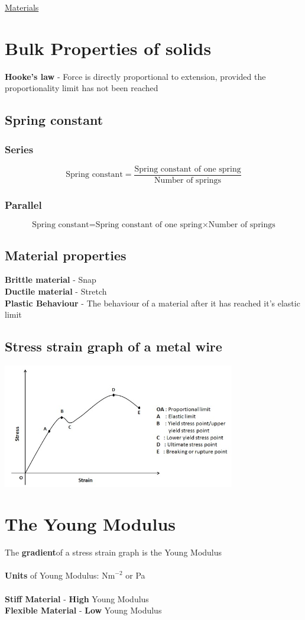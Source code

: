 \documentclass{article}[18pt]
\begin{document}
\begin{center}
\underline{\huge Materials}
\end{center}
\section{Bulk Properties of solids}
\textbf{Hooke's law} - Force is directly proportional to extension, provided the proportionality limit has not been reached
\subsection{Spring constant}
\subsubsection{Series}
$$\text{Spring constant}=\dfrac{\text{Spring constant of one spring}}{\text{Number of springs}}$$
\subsubsection{Parallel}
$$\text{Spring constant=Spring constant of one spring} \times \text{Number of springs}$$
\subsection{Material properties}
\textbf{Brittle material} - Snap\\
\textbf{Ductile material} - Stretch\\
\textbf{Plastic Behaviour} - The behaviour of a material after it has reached it's elastic limit
\subsection{Stress strain graph of a metal wire}
\includegraphics[width=4in]{Stress_Strain.jpg}\\
\section{The Young Modulus}
The \textbf{gradient}of a stress strain graph is the Young Modulus\\
\\
\textbf{Units} of Young Modulus: $\text{Nm}^{-2}$ or Pa\\
\\
\textbf{Stiff Material} - \textbf{High} Young Modulus\\
\textbf{Flexible Material} - \textbf{Low} Young Modulus\\
\newpage
\end{document}
